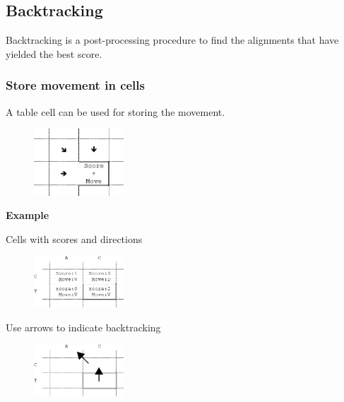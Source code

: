 
%

%
%
\subsection{Backtracking}
Backtracking is a post-processing procedure to find the alignments that have yielded the best score. 

%
%
\subsubsection*{Store movement in cells}

A table cell can be used for storing the movement.
\begin{figure}[H]
  \centering
      \includegraphics[width=0.3\textwidth]{fig02/back_tracking_store_moves.png}
\end{figure}

\noindent \textbf{Example}
\begin{multicols}{2}
Cells with scores and directions
\begin{figure}[H]
  \centering
      \includegraphics[width=0.3\textwidth]{fig02/back_tracking_store_moves_example.png}
\end{figure}

Use arrows to indicate backtracking
\begin{figure}[H]
  \centering
      \includegraphics[width=0.3\textwidth]{fig02/back_tracking_store_moves_arrows.png}
\end{figure}

\end{multicols} 

